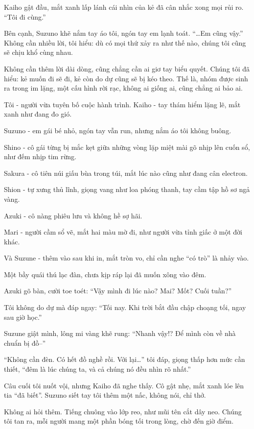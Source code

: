 \documentclass[../main.tex]{subfiles}
\begin{document}
Kaiho gật đầu, mắt xanh lấp lánh cái nhìn của kẻ đã cân nhắc xong mọi rủi ro. ``Tôi đi cùng.''

Bên cạnh, Suzuno khẽ nắm tay áo tôi, ngón tay em lạnh toát. ``\dots Em cũng vậy.'' Không cần nhiều lời, tôi hiểu: dù có mọi thứ xảy ra như thế nào, chúng tôi cũng sẽ chịu khổ cùng nhau.

Không cần thêm lời dài dòng, cũng chẳng cần ai giơ tay biểu quyết. Chúng tôi đã hiểu: kẻ muốn đi sẽ đi, kẻ còn do dự cũng sẽ bị kéo theo. Thế là, nhóm được sinh ra trong im lặng, một cấu hình rời rạc, không ai giống ai, cũng chẳng ai bảo ai.

Tôi - người vừa tuyên bố cuộc hành trình.
Kaiho - tay thám hiểm lặng lẽ, mắt xanh như đang đo gió.

Suzuno - em gái bé nhỏ, ngón tay vẫn run, nhưng nắm áo tôi không buông.

Shino - cô gái từng bị mắc kẹt giữa những vòng lặp miệt mài gõ nhịp lên cuốn sổ, như đếm nhịp tim rừng.

Sakura - cô tiên núi giấu bùa trong túi, mắt lúc nào cũng như đang cân electron.

Shion - tự xưng thủ lĩnh, giọng vang như loa phóng thanh, tay cầm tập hồ sơ ngả vàng.

Azuki - cô nàng phiêu lưu và không hề sợ hãi.

Mari - người cầm sổ vẽ, mắt hai màu mờ đi, như người vừa tỉnh giấc ở một đời khác.

Và Suzune - thêm vào sau khi in, mắt tròn vo, chỉ cần nghe ``có trò'' là nhảy vào.

Một bầy quái thú lạc đàn, chưa kịp ráp lại đã muốn xông vào đêm.

Azuki gõ bàn, cười toe toét: ``Vậy mình đi lúc nào? Mai? Mốt? Cuối tuần?''

Tôi không do dự mà đáp ngay: ``Tối nay. Khi trời bắt đầu chập choạng tối, ngay sau giờ học.''

Suzune giật mình, lông mi vàng khẽ rung: ``Nhanh vậy!? Để mình còn về nhà chuẩn bị đồ--''

``Không cần đèn. Có hết đồ nghề rồi. Với lại\dots'' tôi đáp, giọng thấp hơn mức cần thiết, ``đêm là lúc chúng ta, và cả chúng nó đều nhìn rõ nhất.''

Câu cuối tôi nuốt vội, nhưng Kaiho đã nghe thấy. Cô gật nhẹ, mắt xanh lóe lên tia ``đã biết''. Suzuno siết tay tôi thêm một nấc, không nói, chỉ thở.

Không ai hỏi thêm. Tiếng chuông vào lớp reo, như mũi tên cắt dây neo. Chúng tôi tan ra, mỗi người mang một phần bóng tối trong lòng, chờ đến giờ điểm.
\end{document}
